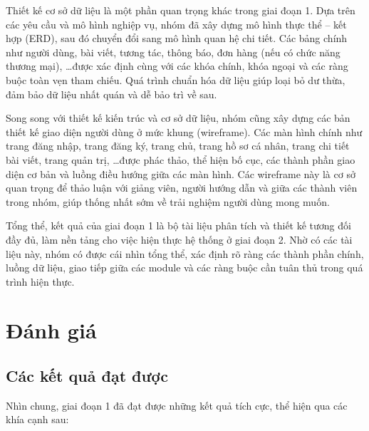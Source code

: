 Thiết kế cơ sở dữ liệu là một phần quan trọng khác trong giai đoạn 1. Dựa trên các yêu cầu và mô hình nghiệp vụ, nhóm đã xây dựng mô hình thực thể -- kết hợp (ERD), sau đó chuyển đổi sang mô hình quan hệ chi tiết. Các bảng chính như người dùng, bài viết, tương tác, thông báo, đơn hàng (nếu có chức năng thương mại), \ldots được xác định cùng với các khóa chính, khóa ngoại và các ràng buộc toàn vẹn tham chiếu. Quá trình chuẩn hóa dữ liệu giúp loại bỏ dư thừa, đảm bảo dữ liệu nhất quán và dễ bảo trì về sau.

Song song với thiết kế kiến trúc và cơ sở dữ liệu, nhóm cũng xây dựng các bản thiết kế giao diện người dùng ở mức khung (wireframe). Các màn hình chính như trang đăng nhập, trang đăng ký, trang chủ, trang hồ sơ cá nhân, trang chi tiết bài viết, trang quản trị, \ldots được phác thảo, thể hiện bố cục, các thành phần giao diện cơ bản và luồng điều hướng giữa các màn hình. Các wireframe này là cơ sở quan trọng để thảo luận với giảng viên, người hướng dẫn và giữa các thành viên trong nhóm, giúp thống nhất sớm về trải nghiệm người dùng mong muốn.

Tổng thể, kết quả của giai đoạn 1 là bộ tài liệu phân tích và thiết kế tương đối đầy đủ, làm nền tảng cho việc hiện thực hệ thống ở giai đoạn 2. Nhờ có các tài liệu này, nhóm có được cái nhìn tổng thể, xác định rõ ràng các thành phần chính, luồng dữ liệu, giao tiếp giữa các module và các ràng buộc cần tuân thủ trong quá trình hiện thực.

\section{Đánh giá}

\subsection{Các kết quả đạt được}

Nhìn chung, giai đoạn 1 đã đạt được những kết quả tích cực, thể hiện qua các khía cạnh sau:


